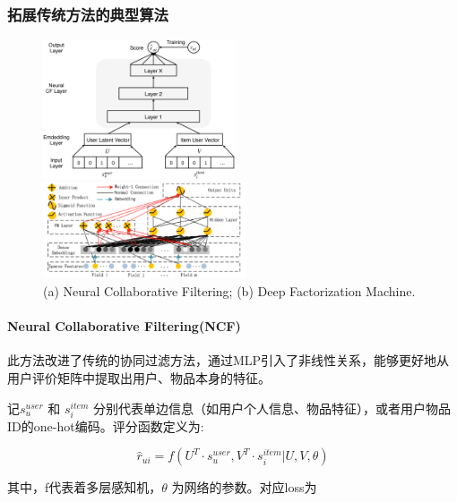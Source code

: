 \subsubsection{拓展传统方法的典型算法}
\begin{figure}
\begin{center}
\begin{minipage}[t]{5.7cm}
\includegraphics[width=5.7cm]{MusicRecomSurvey/pics/neumf.png}
\end{minipage}
\hspace{1cm}
\begin{minipage}[t]{6.0cm}
\includegraphics[width=6.0cm]{MusicRecomSurvey/pics/DeepFM.png}
\end{minipage}
\caption{(a) Neural Collaborative Filtering; (b) Deep Factorization Machine.}
\label{fig:ncf}
\end{center}
\end{figure}
\paragraph{Neural Collaborative Filtering(NCF)\cite{he2017neural}}
此方法改进了传统的协同过滤方法，通过MLP引入了非线性关系，能够更好地从用户评价矩阵中提取出用户、物品本身的特征。

记$s_{u}^{u s e r}$ 和 $s_{i}^{i t e m}$ 分别代表单边信息（如用户个人信息、物品特征），或者用户物品ID的one-hot编码。评分函数定义为:
    
\begin{equation}
\hat{r}_{u i}=f\left(U^{T} \cdot s_{u}^{u s e r}, V^{T} \cdot s_{i}^{i t e m} | U, V, \theta\right)
\end{equation}
    
    其中，f代表着多层感知机，$\theta$ 为网络的参数。对应loss为
    
